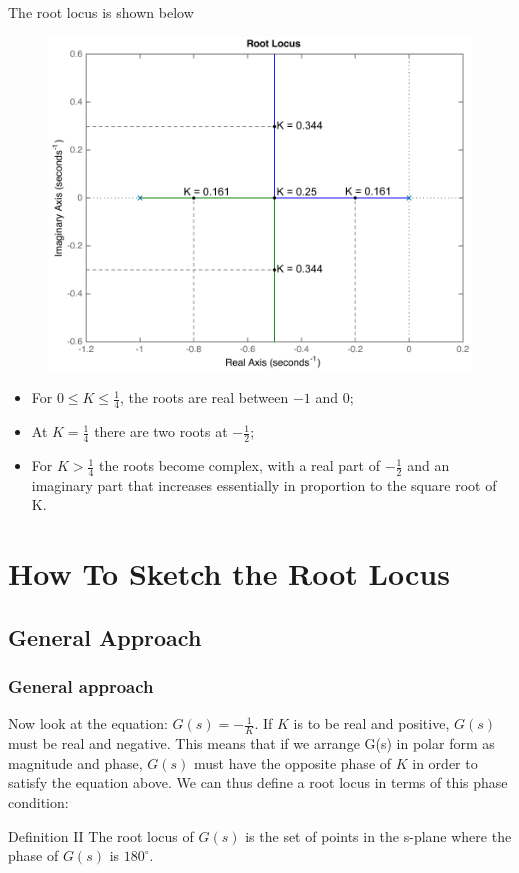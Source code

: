 \begin{frame}
	\begin{exampleblock}{}
		The root locus is shown below
		\begin{figure}
			\centering
			\includegraphics[width=0.7\linewidth]{root_locus_ex1}
		\end{figure}
	\end{exampleblock}
\end{frame}

\begin{frame}
	\begin{exampleblock}{}
		\begin{itemize}
		\item For $0\leq K \leq \frac{1}{4}$, the roots are real between $-1$ and $0$;
		\item At $K = \frac{1}{4}$ there are two roots at $-\frac{1}{2}$;
		\item For $K>\frac{1}{4}$ the roots become complex, with a real part of $-\frac{1}{2}$ and an imaginary part that increases essentially in proportion to the square root of K.
		\end{itemize}
	\end{exampleblock}
\end{frame}

\section{How To Sketch the Root Locus}

\subsection{General Approach}

\begin{frame}
\frametitle{General approach}
	Now look at the equation: $G(s) = -\frac{1}{K}$. If $K$ is to be real and positive, $G(s)$ must be real and negative. This means that if we arrange G(s) in polar form as magnitude and phase, $G(s)$ must have the opposite phase of $K$ in order to satisfy the equation above. We can thus define a root locus in terms of this phase condition:  
	\vspace{0.5em}
	\begin{block}{Definition II}
		The root locus of $G(s)$ is the set of points in the s-plane where the phase of $G(s)$ is $180^{\circ}$.	
	\end{block}
\end{frame}

